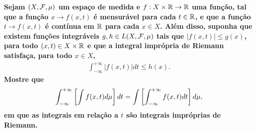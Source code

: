 \textbf{Sejam $(X, \mathcal F, \mu)$ um espaço de medida e $f: X \times \mathbb R \rightarrow \mathbb R$ uma função, 
tal que a função $x \rightarrow f(x, t)$ é mensurável para cada $t \in \mathbb R$, e que a função 
$t \rightarrow f(x, t)$ é contínua em $\mathbb R$ para cada $x \in X$. Além disso, suponha que existem funções 
integráveis $g, h \in L(X, \mathcal F, \mu)$ tais que $|f(x, t)| \le g(x)$, para todo $(x, t) \in X\times \mathbb R$
e que a integral imprópria de Riemann satisfaça, para todo $x \in X$,
\begin{align*}
  \int_{-\infty}^{+\infty} |f(x, t)|dt \le h(x).
\end{align*}
Mostre que 
\begin{align*}
  \int_{-\infty}^{+\infty}\left[\int f(x, t)d\mu\right]dt = \int \left[\int_{-\infty}^{+\infty}f(x, t)dt\right]d\mu,
\end{align*}
em que as integrais em relação a $t$ são integrais impróprias de Riemann.}
